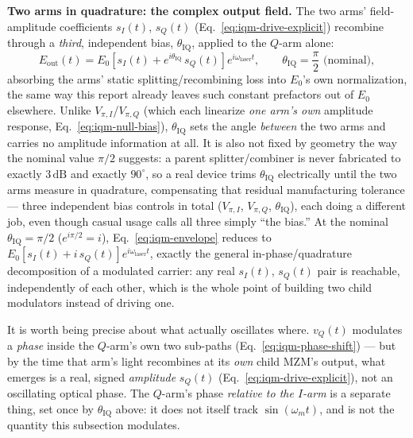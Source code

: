 \documentclass[9pt]{article}
\begin{document}
\textbf{Two arms in quadrature: the complex output field.} The two arms'
field-amplitude coefficients $s_I(t)$, $s_Q(t)$ (Eq.~\eqref{eq:iqm-drive-explicit})
recombine through a \emph{third}, independent bias, $\theta_{\mathrm{IQ}}$,
applied to the $Q$-arm alone:
\begin{equation}
E_{\mathrm{out}}(t) = E_0\left[s_I(t) + e^{i\theta_{\mathrm{IQ}}}\,s_Q(t)\right]e^{i\omega_{\mathrm{laser}}t},
\qquad \theta_{\mathrm{IQ}} = \frac{\pi}{2} \text{ (nominal)},
\label{eq:iqm-envelope}
\end{equation}
absorbing the arms' static splitting/recombining loss into $E_0$'s own
normalization, the same way this report already leaves such constant
prefactors out of $E_0$ elsewhere. Unlike $V_{\pi,I}$/$V_{\pi,Q}$ (which each
linearize \emph{one arm's own} amplitude response, Eq.~\eqref{eq:iqm-null-bias}),
$\theta_{\mathrm{IQ}}$ sets the angle \emph{between} the two arms and carries
no amplitude information at all. It is also not fixed by geometry the way
the nominal value $\pi/2$ suggests: a parent splitter/combiner is never
fabricated to exactly $3\,\mathrm{dB}$ and exactly $90^\circ$, so a real
device trims $\theta_{\mathrm{IQ}}$ electrically until the two arms measure
in quadrature, compensating that residual manufacturing tolerance --- three
independent bias controls in total ($V_{\pi,I}$, $V_{\pi,Q}$,
$\theta_{\mathrm{IQ}}$), each doing a different job, even though casual
usage calls all three simply ``the bias.'' At the nominal
$\theta_{\mathrm{IQ}}=\pi/2$ ($e^{i\pi/2}=i$), Eq.~\eqref{eq:iqm-envelope}
reduces to $E_0[s_I(t)+i\,s_Q(t)]e^{i\omega_{\mathrm{laser}}t}$, exactly the
general in-phase/quadrature decomposition of a modulated carrier: any real
$s_I(t)$, $s_Q(t)$ pair is reachable, independently of each other, which is
the whole point of building two child modulators instead of driving one.

It is worth being precise about what actually oscillates where. $v_Q(t)$
modulates a \emph{phase} inside the $Q$-arm's own two sub-paths
(Eq.~\eqref{eq:iqm-phase-shift}) --- but by the time that arm's light
recombines at its \emph{own} child MZM's output, what emerges is a real,
signed \emph{amplitude} $s_Q(t)$ (Eq.~\eqref{eq:iqm-drive-explicit}), not an
oscillating optical phase. The $Q$-arm's phase \emph{relative to the
$I$-arm} is a separate thing, set once by $\theta_{\mathrm{IQ}}$ above: it
does not itself track $\sin(\omega_m t)$, and is not the quantity this
subsection modulates.
\end{document}
